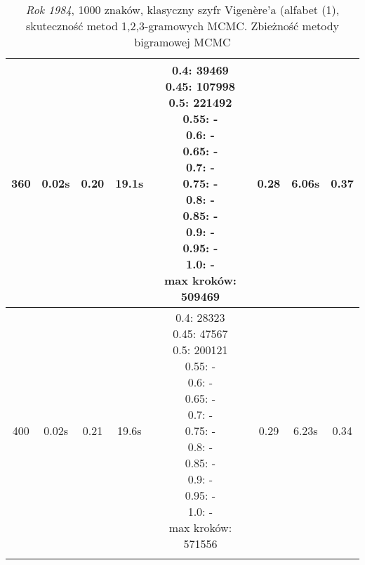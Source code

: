 \documentclass[a4paper]{article}
\theoremstyle{defn}
\theoremstyle{theorem}
\theoremstyle{lemma}
\theoremstyle{cor}
\theoremstyle{fact}
\begin{document}
\begin{center}
\begin{tiny}
\begin{longtable}{|c|c|c|c|c|c|c|c|}
360 & 0.02s & 0.20 & 19.1s & \makecell{0.4: 39469\\0.45: 107998\\0.5: 221492\\0.55: -\\0.6: -\\0.65: -\\0.7: -\\0.75: -\\0.8: -\\0.85: -\\0.9: -\\0.95: -\\1.0: -\\ max kroków: 509469} & 0.28 & 6.06s & 0.37 \\ \hline 
400 & 0.02s & 0.21 & 19.6s & \makecell{0.4: 28323\\0.45: 47567\\0.5: 200121\\0.55: -\\0.6: -\\0.65: -\\0.7: -\\0.75: -\\0.8: -\\0.85: -\\0.9: -\\0.95: -\\1.0: -\\ max kroków: 571556} & 0.29 & 6.23s & 0.34 \\ \hline 
\caption{\textit{Rok 1984}, 1000 znaków, klasyczny szyfr Vigenère'a (alfabet (1), skuteczność metod 1,2,3-gramowych MCMC. Zbieżność metody bigramowej MCMC}
\end{longtable}\end{tiny}\end{center} 
\end{document}
